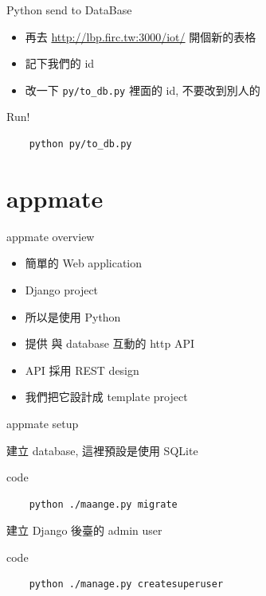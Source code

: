 \documentclass{beamer}
\begin{document}
\begin{frame}[fragile]{Python send to DataBase}
  \Large
  \begin{itemize}
    \item 再去 \url{http://lbp.firc.tw:3000/iot/} 開個新的表格

    \item 記下我們的 id

    \item 改一下 \verb`py/to_db.py` 裡面的 id, 不要改到別人的
  \end{itemize}


  Run!
  \begin{verbatim}
    python py/to_db.py
  \end{verbatim}
\end{frame}


\section{appmate}

\begin{frame}{appmate overview}
  \Large

  \begin{itemize}
    \item 簡單的 Web application

    \item Django project

    \item 所以是使用 Python

    \item 提供 與 database 互動的 http API

    \item API 採用 REST design

    \item 我們把它設計成 template project
  \end{itemize}
\end{frame}

\begin{frame}[fragile]{appmate setup}

  建立 database, 這裡預設是使用 SQLite
  \begin{block}{code}
  \begin{verbatim}
    python ./maange.py migrate
  \end{verbatim}
  \end{block}

  建立 Django 後臺的 admin user
  \begin{block}{code}
  \begin{verbatim}
    python ./manage.py createsuperuser
  \end{verbatim}
  \end{block}
\end{frame}
\end{document}
